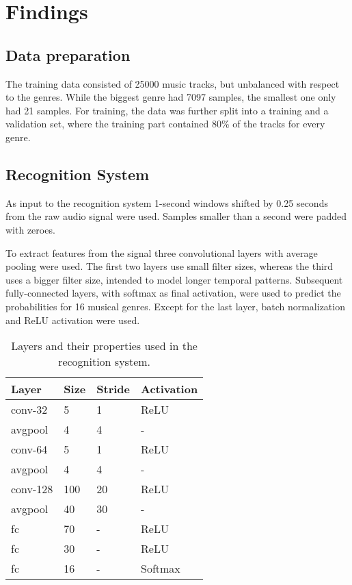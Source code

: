 \documentclass[11pt, twocolumn]{article}
\begin{document}
\section{Findings}

\subsection{Data preparation}
The training data consisted of 25000 music tracks, but unbalanced with respect to the genres. While the biggest genre had 7097 samples, the smallest one only had 21 samples. For training, the data was further split into a training and a validation set, where the training part contained 80\% of the tracks for every genre.

\subsection{Recognition System}
As input to the recognition system 1-second windows shifted by 0.25 seconds from the raw audio signal were used. Samples smaller than a second were padded with zeroes.

To extract features from the signal three convolutional layers with average pooling were used. The first two layers use small filter sizes, whereas the third uses a bigger filter size, intended to model longer temporal patterns. Subsequent fully-connected layers, with softmax as final activation, were used to predict the probabilities for 16 musical genres. Except for the last layer, batch normalization and ReLU activation were used.

\begin{table}[h]
\centering
		\begin{tabular}{|l|l|l|l|}			
			\hline
			Layer & Size & Stride & Activation  \\
			\hline\hline
			conv-32 & 5 & 1 & ReLU \\
			avgpool & 4 & 4 & - \\
			conv-64 & 5 & 1 & ReLU \\
			avgpool & 4 & 4 & - \\
			conv-128 & 100 & 20 & ReLU \\
			avgpool & 40 & 30 & - \\
			fc & 70 & - & ReLU \\
			fc & 30 & - & ReLU \\
			fc & 16 & - & Softmax \\
			\hline
		\end{tabular}
		\caption{Layers and their properties used in the recognition system.}\label{table-6}	
\end{table}
\end{document}
